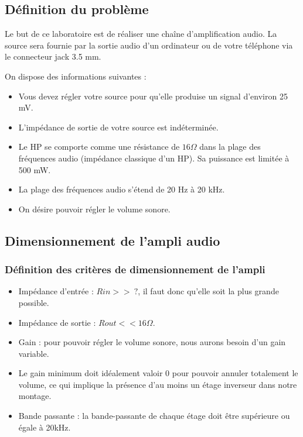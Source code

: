 \documentclass{../template/labo}
\begin{document}
\subsection{Définition du problème}
Le but de ce laboratoire est de réaliser une chaîne d'amplification audio.
La source sera fournie par la sortie audio d'un ordinateur ou de votre téléphone via le connecteur jack 3.5 mm.

On dispose des informations suivantes :
\vspace{3mm}
\begin{itemize}
\item Vous devez régler votre source pour qu'elle produise un signal d'environ 25 mV.
\item L'impédance de sortie de votre source est indéterminée.
\item Le HP se comporte comme une résistance de $16\Omega$ dans la plage des fréquences audio (impédance classique d'un HP). Sa puissance est limitée à 500 mW.
\item La plage des fréquences audio s'étend de 20 Hz à 20 kHz.
\item On désire pouvoir régler le volume sonore.
\end{itemize}


\subsection{Dimensionnement de l'ampli audio}
\label{Dimensionnement}

\subsubsection{Définition des critères de dimensionnement de l'ampli}

\begin{itemize}
\item Impédance d'entrée : $Rin >>\ ?$, il faut donc qu'elle soit la plus grande possible.
\item Impédance de sortie : $Rout << 16\Omega$.
\item Gain : pour pouvoir régler le volume sonore, nous aurons besoin d'un gain variable.
\item Le gain minimum doit idéalement valoir 0 pour pouvoir annuler totalement le volume, ce qui implique la présence d'au moins un étage inverseur dans notre montage.
\item Bande passante : la bande-passante de chaque étage doit être supérieure ou égale à 20kHz.
\end{itemize}
\end{document}
